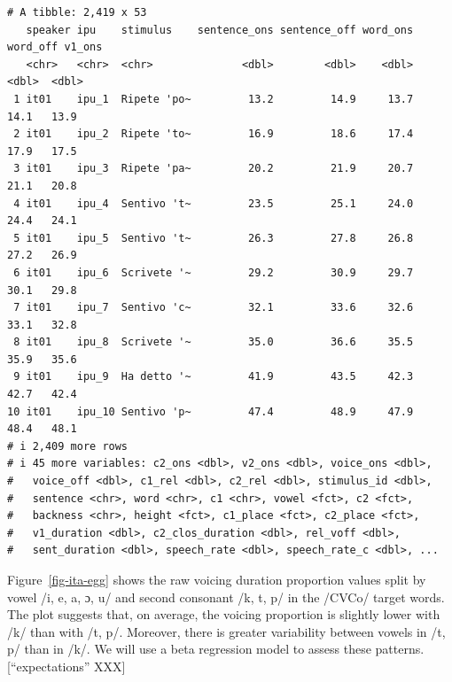 \documentclass[
  authoryear,
  preprint,
  3p]{elsarticle}
\begin{document}
\begin{verbatim}
# A tibble: 2,419 x 53
   speaker ipu    stimulus    sentence_ons sentence_off word_ons word_off v1_ons
   <chr>   <chr>  <chr>              <dbl>        <dbl>    <dbl>    <dbl>  <dbl>
 1 it01    ipu_1  Ripete 'po~         13.2         14.9     13.7     14.1   13.9
 2 it01    ipu_2  Ripete 'to~         16.9         18.6     17.4     17.9   17.5
 3 it01    ipu_3  Ripete 'pa~         20.2         21.9     20.7     21.1   20.8
 4 it01    ipu_4  Sentivo 't~         23.5         25.1     24.0     24.4   24.1
 5 it01    ipu_5  Sentivo 't~         26.3         27.8     26.8     27.2   26.9
 6 it01    ipu_6  Scrivete '~         29.2         30.9     29.7     30.1   29.8
 7 it01    ipu_7  Sentivo 'c~         32.1         33.6     32.6     33.1   32.8
 8 it01    ipu_8  Scrivete '~         35.0         36.6     35.5     35.9   35.6
 9 it01    ipu_9  Ha detto '~         41.9         43.5     42.3     42.7   42.4
10 it01    ipu_10 Sentivo 'p~         47.4         48.9     47.9     48.4   48.1
# i 2,409 more rows
# i 45 more variables: c2_ons <dbl>, v2_ons <dbl>, voice_ons <dbl>,
#   voice_off <dbl>, c1_rel <dbl>, c2_rel <dbl>, stimulus_id <dbl>,
#   sentence <chr>, word <chr>, c1 <chr>, vowel <fct>, c2 <fct>,
#   backness <chr>, height <fct>, c1_place <fct>, c2_place <fct>,
#   v1_duration <dbl>, c2_clos_duration <dbl>, rel_voff <dbl>,
#   sent_duration <dbl>, speech_rate <dbl>, speech_rate_c <dbl>, ...
\end{verbatim}

Figure~\ref{fig-ita-egg} shows the raw voicing duration proportion
values split by vowel /i, e, a, ɔ, u/ and second consonant /k, t, p/ in
the /CVCo/ target words. The plot suggests that, on average, the voicing
proportion is slightly lower with /k/ than with /t, p/. Moreover, there
is greater variability between vowels in /t, p/ than in /k/. We will use
a beta regression model to assess these patterns. {[}``expectations''
XXX{]}
\end{document}
